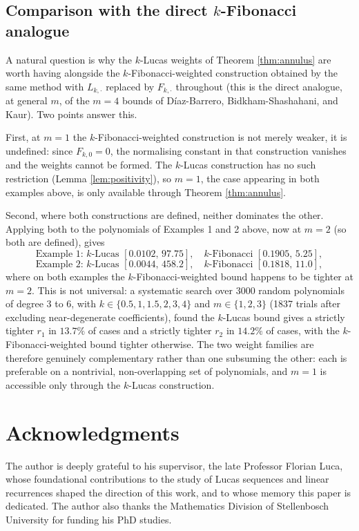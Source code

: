 \documentclass[11pt,a4paper]{article}
\numberwithin{equation}{section}
\numberwithin{table}{section}
\numberwithin{figure}{section}
\begin{document}
\subsection*{Comparison with the direct $k$-Fibonacci analogue}

A natural question is why the $k$-Lucas weights of Theorem \ref{thm:annulus} are worth having alongside the $k$-Fibonacci-weighted construction obtained by the same method with $L_{k,\cdot}$ replaced by $F_{k,\cdot}$ throughout (this is the direct analogue, at general $m$, of the $m=4$ bounds of D\'iaz-Barrero, Bidkham-Shashahani, and Kaur). Two points answer this.

First, at $m=1$ the $k$-Fibonacci-weighted construction is not merely weaker, it is undefined: since $F_{k,0}=0$, the normalising constant in that construction vanishes and the weights cannot be formed. The $k$-Lucas construction has no such restriction (Lemma \ref{lem:positivity}), so $m=1$, the case appearing in both examples above, is only available through Theorem \ref{thm:annulus}.

Second, where both constructions are defined, neither dominates the other. Applying both to the polynomials of Examples 1 and 2 above, now at $m=2$ (so both are defined), gives
\[
\text{Example 1: } k\text{-Lucas } [0.0102,\,97.75], \quad k\text{-Fibonacci } [0.1905,\,5.25],
\]
\[
\text{Example 2: } k\text{-Lucas } [0.0044,\,458.2], \quad k\text{-Fibonacci } [0.1818,\,11.0],
\]
where on both examples the $k$-Fibonacci-weighted bound happens to be tighter at $m=2$. This is not universal: a systematic search over 3000 random polynomials of degree $3$ to $6$, with $k\in\{0.5,1,1.5,2,3,4\}$ and $m\in\{1,2,3\}$ (1837 trials after excluding near-degenerate coefficients), found the $k$-Lucas bound gives a strictly tighter $r_1$ in $13.7\%$ of cases and a strictly tighter $r_2$ in $14.2\%$ of cases, with the $k$-Fibonacci-weighted bound tighter otherwise. The two weight families are therefore genuinely complementary rather than one subsuming the other: each is preferable on a nontrivial, non-overlapping set of polynomials, and $m=1$ is accessible only through the $k$-Lucas construction.

	
\section*{Acknowledgments}
The author is deeply grateful to his supervisor, the late Professor Florian Luca, whose foundational contributions to the study of Lucas sequences and linear recurrences shaped the direction of this work, and to whose memory this paper is dedicated. The author also thanks the Mathematics Division of Stellenbosch University for funding his PhD studies.
	
\end{document}
